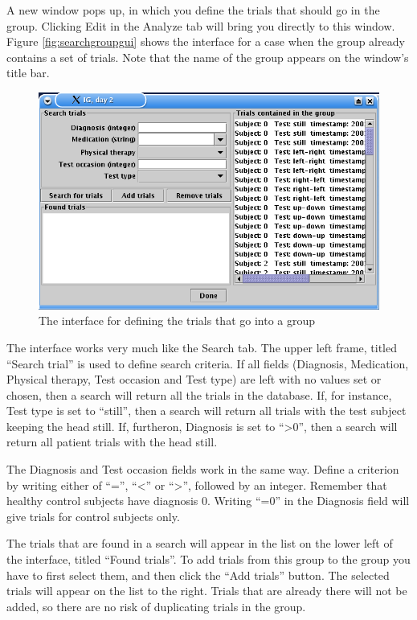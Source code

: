 \documentclass[a4paper,11pt]{article}
\begin{document}
A new window pops up, in which you define the trials that
should go in the group. Clicking Edit in the Analyze tab will bring
you directly to this window. Figure \ref{fig:searchgroupgui} shows the
interface for a case when the group already contains a set of
trials. Note that the name of the group appears on the window's title bar.
  \begin{figure}[htbp]
    \centering
    \includegraphics[width=120mm]{figures/searchgroupgui.png}
    \caption{The interface for defining the trials that go into a group}
    \label{fig:groupdescription}
  \end{figure}
The interface works very much like the Search tab. The upper left
frame, titled ``Search trial'' is used to define search criteria. If
all fields (Diagnosis, Medication, Physical therapy, Test occasion and
Test type) are left with no values set or chosen, then a search will
return all the trials in the database. If, for instance, Test type is
set to ``still'', then a search will return all trials with the test
subject keeping the head still. If, furtheron, Diagnosis is set to
``>0'', then a search will return all patient trials with the head
still. 

The Diagnosis and Test occasion fields work in the same way. Define a
criterion by writing either of ``='', ``<'' or ``>'', followed by an
integer. Remember that healthy control subjects have diagnosis
0. Writing ``=0'' in the Diagnosis field will give trials for control
subjects only. 

The trials that are found in a search will appear in the list on the
lower left of the interface, titled ``Found trials''. To add trials
from this group to the group you have to first select them, and then
click the ``Add trials'' button. The selected trials will appear on
the list to the right. Trials that are already there will not be
added, so there are no risk of duplicating trials in the group. 
\end{document}
